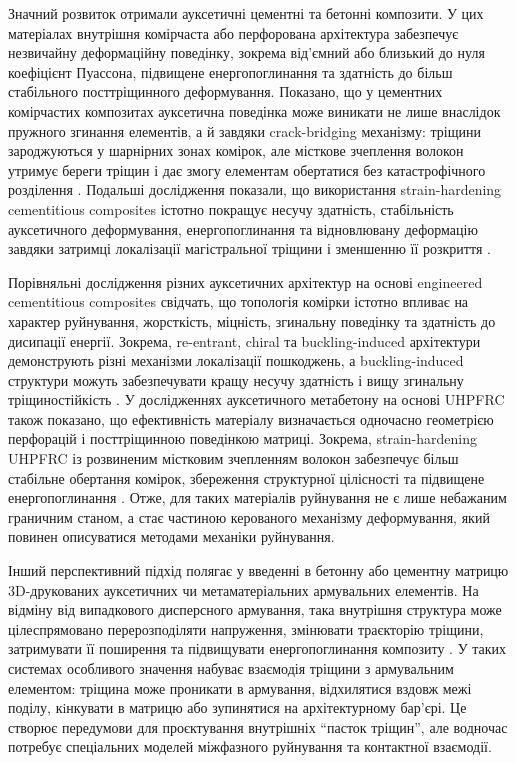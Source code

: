 \documentclass[12pt,a4paper]{article}
\begin{document}
Значний розвиток отримали ауксетичні цементні та бетонні композити. У цих матеріалах внутрішня комірчаста або перфорована архітектура забезпечує незвичайну деформаційну поведінку, зокрема від'ємний або близький до нуля коефіцієнт Пуассона, підвищене енергопоглинання та здатність до більш стабільного посттріщинного деформування. Показано, що у цементних комірчастих композитах ауксетична поведінка може виникати не лише внаслідок пружного згинання елементів, а й завдяки crack-bridging механізму: тріщини зароджуються у шарнірних зонах комірок, але місткове зчеплення волокон утримує береги тріщин і дає змогу елементам обертатися без катастрофічного розділення \cite{Xu2020}. Подальші дослідження показали, що використання strain-hardening cementitious composites істотно покращує несучу здатність, стабільність ауксетичного деформування, енергопоглинання та відновлювану деформацію завдяки затримці локалізації магістральної тріщини і зменшенню її розкриття \cite{Xie2025}.

Порівняльні дослідження різних ауксетичних архітектур на основі engineered cementitious composites свідчать, що топологія комірки істотно впливає на характер руйнування, жорсткість, міцність, згинальну поведінку та здатність до дисипації енергії. Зокрема, re-entrant, chiral та buckling-induced архітектури демонструють різні механізми локалізації пошкоджень, а buckling-induced структури можуть забезпечувати кращу несучу здатність і вищу згинальну тріщиностійкість \cite{Chen2024}. У дослідженнях ауксетичного метабетону на основі UHPFRC також показано, що ефективність матеріалу визначається одночасно геометрією перфорацій і посттріщинною поведінкою матриці. Зокрема, strain-hardening UHPFRC із розвиненим містковим зчепленням волокон забезпечує більш стабільне обертання комірок, збереження структурної цілісності та підвищене енергопоглинання \cite{Vo2025}. Отже, для таких матеріалів руйнування не є лише небажаним граничним станом, а стає частиною керованого механізму деформування, який повинен описуватися методами механіки руйнування.

Інший перспективний підхід полягає у введенні в бетонну або цементну матрицю 3D-друкованих ауксетичних чи метаматеріальних армувальних елементів. На відміну від випадкового дисперсного армування, така внутрішня структура може цілеспрямовано перерозподіляти напруження, змінювати траєкторію тріщини, затримувати її поширення та підвищувати енергопоглинання композиту \cite{Vandadi2025}. У таких системах особливого значення набуває взаємодія тріщини з армувальним елементом: тріщина може проникати в армування, відхилятися вздовж межі поділу, кiнкувати в матрицю або зупинятися на архітектурному бар'єрі. Це створює передумови для проєктування внутрішніх ``пасток тріщин'', але водночас потребує спеціальних моделей міжфазного руйнування та контактної взаємодії.
\end{document}
